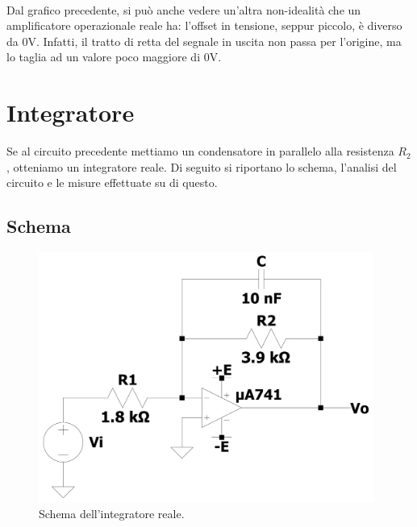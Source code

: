 \documentclass{report}
\begin{document}
\\Dal grafico precedente, si può anche vedere un'altra non-idealità che un amplificatore operazionale reale ha: l'offset in tensione, seppur piccolo, è diverso da 0V. Infatti, il tratto di retta del segnale in uscita non passa per l'origine, ma lo taglia ad un valore poco maggiore di 0V.
\section{Integratore} \label{int_cap}
Se al circuito precedente mettiamo un condensatore in parallelo alla resistenza $R_2$, otteniamo un integratore reale. Di seguito si riportano lo schema, l'analisi del circuito e le misure effettuate su di questo.
\subsection{Schema}
\begin{figure}[h]
\centering
\includegraphics[height=8.2cm]{immagini/int}
\caption{Schema dell'integratore reale.}
\label{figura:int}
\end{figure}
\end{document}
